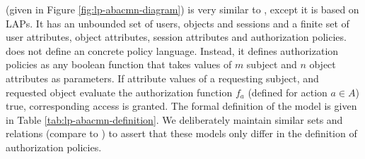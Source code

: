 %
  
  

 \LPMN{} (given in Figure \ref{fig:lp-abacmn-diagram}) is very similar to \EPMNModel{}, except it is based on LAPs.  It has an unbounded set of users, objects and sessions and a finite set of user attributes, object attributes, session attributes and authorization policies. \LPMN{} does not define an concrete policy language. Instead, it defines  authorization policies as any boolean function that takes values of $m$ subject and $n$ object attributes as parameters. If attribute values of a requesting subject, and requested object evaluate the authorization function $f_a$ (defined for action $a \in A$) true, corresponding access is granted. The formal definition of the model is given in Table \ref{tab:lp-abacmn-definition}. We deliberately maintain similar sets and relations (compare to \EPMNModel{})  to assert that these models only differ in the definition of authorization policies. 
 

